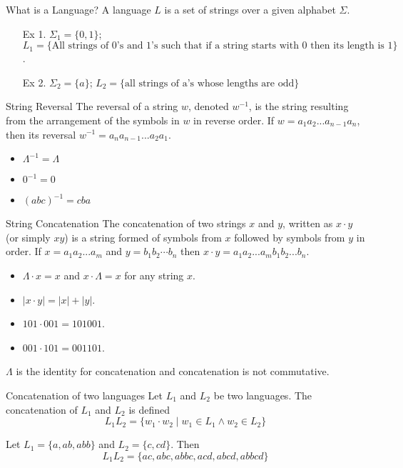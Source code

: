 \documentclass[notes=none]{beamer}
\begin{document}
\begin{frame}{What is a Language?}
    A language $L$  is a set of strings over a given alphabet $\Sigma$.
    \begin{itemize}
    \item [Ex 1.] $\Sigma_1=\{0,1\}$; $L_1=\{\mbox{All strings of 0's and 1's such that if a string starts with 0 then its length is 1}\}$.
    \item [Ex 2.] $\Sigma_2=\{a\}$; $L_2=\{\mbox{all strings of a's whose lengths are odd}\}$
    \end{itemize}
\end{frame}

\begin{frame}{String Reversal}
    The reversal of a string $w$, denoted $w^{-1}$,  is the string resulting from the arrangement of  the symbols in $w$ in reverse order. If $w=a_{1}a_{2}...a_{n-1}a_{n}$, then its reversal $w^{-1}=a_{n}a_{n-1}...a_{2}a_{1}$.
    \begin{itemize}
    \item $\Lambda^{-1}=\Lambda$
    \item $0^{-1}=0$
    \item $(abc)^{-1}=cba$
\end{itemize}
\end{frame}

\begin{frame}{String Concatenation}
    The concatenation of two strings $x$ and $y$, written as  $x\cdot y$ (or simply $xy$) is a string formed of symbols from $x$ followed by symbols from $y$ in order. If $x=a_{1}a_{2}...a_{m}$ and $y=b_1b_2\cdots b_n$ then $x\cdot y=a_1a_2...a_mb_1b_2...b_n$.
    \begin{itemize}
    \item $\Lambda\cdot x=x$ and $x\cdot\Lambda=x$ for any string $x$.
    \item $|x\cdot y| = |x|+|y|$.
    \item $101\cdot 001=101001$.
    \item $001\cdot 101=001101$.
\end{itemize}
$\Lambda$ is the identity for concatenation and concatenation is not commutative.
\end{frame}

\begin{frame}{Concatenation of two languages}
Let $L_1$ and $L_2$ be two languages. The concatenation of $L_1$ and $L_2$ is defined
\[ L_1L_2 = \{w_1\cdot w_2 \mid w_1\in L_1\wedge w_2\in L_2\}
\]

Let $L_1=\{a,ab,abb\}$ and $L_2=\{c,cd\}$. Then
\[ L_1L_2 = \{ac,abc,abbc,acd,abcd,abbcd\}
\]
\end{frame}
\end{document}
